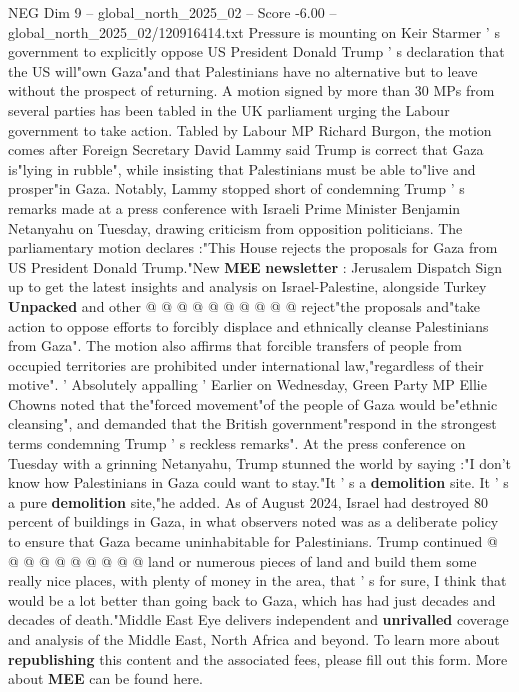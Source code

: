 \begin{textsample}{NEG Dim 9 – global\_north\_2025\_02 – Score -6.00 – global\_north\_2025\_02/120916414.txt}  \label{ex:f9_neg_009}
Pressure is mounting on Keir Starmer ' s government to explicitly oppose US President Donald Trump ' s declaration that the US will"own Gaza"and that Palestinians have no alternative but to leave without the prospect of returning.
A motion signed by more than 30 MPs from several parties has been tabled in the UK parliament urging the Labour government to take action.
Tabled by Labour MP Richard Burgon, the motion comes after Foreign Secretary David Lammy said Trump is correct that Gaza is"lying in rubble", while insisting that Palestinians must be able to"live and prosper"in Gaza.
Notably, Lammy stopped short of condemning Trump ' s remarks made at a press conference with Israeli Prime Minister Benjamin Netanyahu on Tuesday, drawing criticism from opposition politicians.
The parliamentary motion declares :"This House rejects the proposals for Gaza from US President Donald Trump."New \textbf{MEE} \textbf{newsletter} : Jerusalem Dispatch Sign up to get the latest insights and analysis on Israel-Palestine, alongside Turkey \textbf{Unpacked} and other @ @ @ @ @ @ @ @ @ @ reject"the proposals and"take action to oppose efforts to forcibly displace and ethnically cleanse Palestinians from Gaza".
The motion also affirms that forcible transfers of people from occupied territories are prohibited under international law,"regardless of their motive". ' Absolutely appalling ' Earlier on Wednesday, Green Party MP Ellie Chowns noted that the"forced movement"of the people of Gaza would be"ethnic cleansing", and demanded that the British government"respond in the strongest terms condemning Trump ' s reckless remarks".
At the press conference on Tuesday with a grinning Netanyahu, Trump stunned the world by saying :"I don't know how Palestinians in Gaza could want to stay."It ' s a \textbf{demolition} site.
It ' s a pure \textbf{demolition} site,"he added.
As of August 2024, Israel had destroyed 80 percent of buildings in Gaza, in what observers noted was as a deliberate policy to ensure that Gaza became uninhabitable for Palestinians.
Trump continued @ @ @ @ @ @ @ @ @ @ land or numerous pieces of land and build them some really nice places, with plenty of money in the area, that ' s for sure, I think that would be a lot better than going back to Gaza, which has had just decades and decades of death."Middle East Eye delivers independent and \textbf{unrivalled} coverage and analysis of the Middle East, North Africa and beyond.
To learn more about \textbf{republishing} this content and the associated fees, please fill out this form.
More about \textbf{MEE} can be found here.

\end{textsample}
